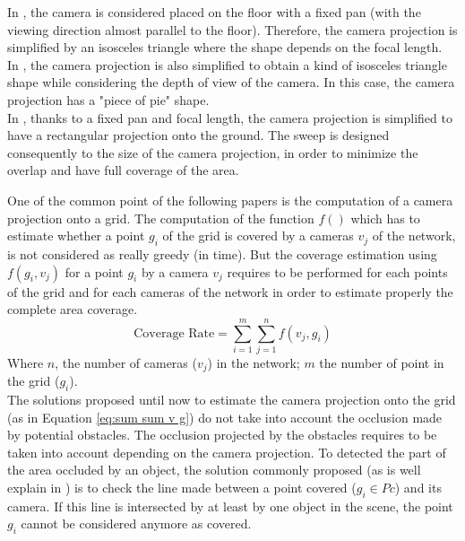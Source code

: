 In \cite{87*morsly2012,194*fu2010}, the camera is considered placed on the floor with a fixed pan (with the viewing direction almost parallel to the floor). Therefore, the camera projection is simplified by an isosceles triangle where the shape depends on the focal length.\\
In \citep{141*akbarzadeh2013}, the camera projection is also simplified to obtain a kind of isosceles triangle shape while considering the depth of view of the camera. In this case, the  camera projection has a "piece of pie" shape. \\
In \citep{146*li2011}, thanks to a fixed pan and focal length, the camera projection is simplified to have a rectangular projection onto the ground. The sweep is designed consequently to the size of the camera projection, in order to minimize the overlap and have full coverage of the area.  

One of the common point of the following papers  \cite{87*morsly2012,141*akbarzadeh2013,146*li2011,194*fu2010,22*zhao2008,33*reddy2012,193*fu2014,181*wang2017,165*jiang2010}    is the computation of a camera projection onto a grid. 
The computation of the function $f()$ which has to estimate whether a point $g_i$ of the grid is covered by a cameras $v_j$ of the network,  is not considered as really greedy (in time). But the coverage estimation using $f(g_i,v_j)$ for a point $g_i$ by a camera $v_j$ requires to be performed for each points of the grid and for each cameras of the network in order to estimate properly the complete area coverage.
	\begin{equation} \label{eq:sum sum v g}
		\mbox{Coverage Rate}=\sum_{i=1}^{m}\sum_{j=1}^{n}f( v_j,g_i)
	\end{equation} %
Where $n$, the number of cameras ($v_j$) in the network; $m$ the number of point in the grid ($g_i$).  \\
The solutions proposed until now to estimate the camera projection onto the grid (as in Equation \ref{eq:sum sum v g})  do not take into account the occlusion made by potential obstacles.
The occlusion  projected by  the obstacles requires to be taken into account depending on the camera projection.
 To detected the part of the area occluded by an object, the solution commonly proposed (as is well explain in  \citep{181*wang2017}) is to check the line made between a point covered ($g_i \in Pc$) and its camera. If this line is intersected by at least by one object in the scene, the point $g_i$ cannot be considered anymore as covered. 

